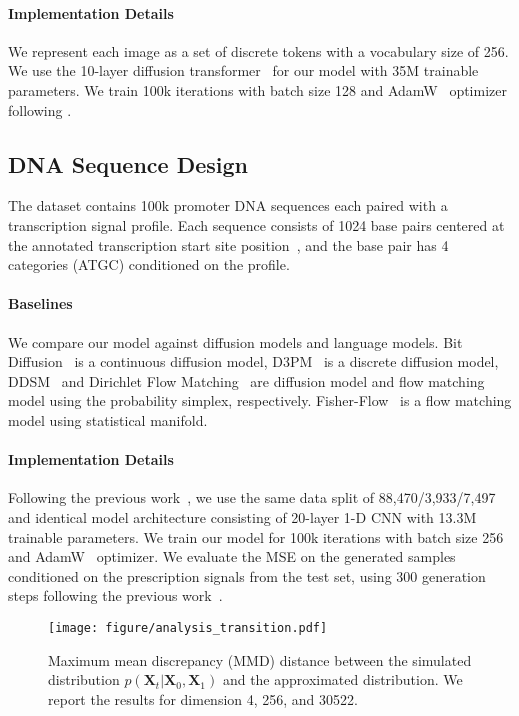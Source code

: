 \paragraph{Implementation Details}
We represent each image as a set of discrete tokens with a vocabulary size of 256.
We use the 10-layer diffusion transformer~\citep{peebles2023dit} for our model with 35M trainable parameters. 
We train 100k iterations with batch size 128 and AdamW~\citep{loshchilov17adamw} optimizer following \citet{shi2024md4}.


\subsection{DNA Sequence Design} \label{app:exp:promoter}
The dataset contains 100k promoter DNA sequences each paired with a transcription signal profile. Each sequence consists of 1024 base pairs centered at the annotated transcription start site position~\citep{hon2017atlas}, and the base pair has 4 categories (ATGC) conditioned on the profile.


\paragraph{Baselines}
We compare our model against diffusion models and language models.
Bit Diffusion~\citep{chen2023self} is a continuous diffusion model, 
D3PM~\citep{austin2021d3pm} is a discrete diffusion model, DDSM~\citep{avdeyev2023dirichlet} and Dirichlet Flow Matching~\citep{stark2024dirichlet} are diffusion model and flow matching model using the probability simplex, respectively. 
Fisher-Flow~\citep{davis2024fisherflow} is a flow matching model using statistical manifold.


\paragraph{Implementation Details}
Following the previous work~\citep{stark2024dirichlet,davis2024fisherflow}, we use the same data split of 88,470/3,933/7,497 and identical model architecture consisting of 20-layer 1-D CNN with 13.3M trainable parameters. We train our model for 100k iterations with batch size 256 and AdamW~\citep{loshchilov17adamw} optimizer.
We evaluate the MSE on the generated samples conditioned on the prescription signals from the test set, using 300 generation steps following the previous work~\citep{davis2024fisherflow}.




\begin{figure}[!t]
    \centering
    \texttt{[image: figure/analysis\_transition.pdf]}
    \caption{
        Maximum mean discrepancy (MMD) distance between the simulated distribution $p(\bm{X}_t|\bm{X}_0,\bm{X}_1)$ and the approximated distribution. We report the results for dimension 4, 256, and 30522.
    }
    \label{fig:analysis_transition}
\end{figure}


